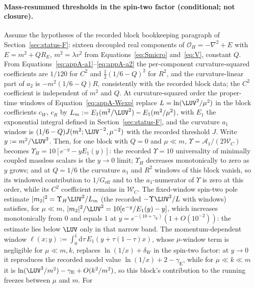 \paragraph{Mass-resummed thresholds in the spin-two factor
(conditional; not closure).}
Assume the hypotheses of the recorded block bookkeeping paragraph of
Section~\ref{sec:status-F}: sixteen decoupled real components of
\(\mathcal O_H=-\nabla^2+E\) with \(E=m^2+Q R_E\),
\(m^2=\lambda v^2\) from Equations~\eqref{eq:Smicro} and~\eqref{eq:V},
constant \(Q\). From Equations~\eqref{eq:appA-a1}--\eqref{eq:appA-a2}
the per-component curvature-squared coefficients are \(1/120\) for
\(C^2\) and \(\tfrac12(1/6-Q)^2\) for \(R^2\), and the
curvature-linear part of \(a_2\) is \(-m^2(1/6-Q)R\), consistently
with the recorded block data; the \(C^2\) coefficient is independent
of \(m^2\) and \(Q\). At curvature-squared order the
proper-time windows of Equation~\eqref{eq:appA-Wexp} replace
\(L=\ln(\LUV^2/\mu^2)\) in the block coefficients \(c_W\), \(c_R\) by
\(L_m:=E_1(m^2/\LUV^2)-E_1(m^2/\mu^2)\), with \(E_1\) the
exponential integral defined in Section~\ref{sec:status-F}, and the
curvature \(a_1\) window is \((1/6-Q)J(m^2;\LUV^{-2},\mu^{-2})\) with
the recorded threshold \(J\). Write \(y:=m^2/\LUV^2\). Then, for one
block with \(Q=0\) and \(\mu\ll m\),
\(\Upsilon=\mathcal A_1/(2\mathcal W_C)\) becomes
\(\Upsilon_H=10[e^{-y}-yE_1(y)]\): the recorded \(\Upsilon=10\)
universality of minimally coupled massless scalars is the \(y\to0\)
limit; \(\Upsilon_H\) decreases monotonically to zero as \(y\) grows;
and at \(Q=1/6\) the curvature \(a_1\) and \(R^2\) windows of this
block vanish, so its windowed contribution to \(1/G_{\mathrm{eff}}\) and to
the \(a_1\)-numerator of \(\Upsilon\) is zero at this order, while its
\(C^2\) coefficient remains in \(\mathcal W_C\). The fixed-window spin-two
pole estimate
\(|m_2|^2=\Upsilon_H\LUV^2/L_m\) (the recorded
\(-\Upsilon\LUV^2/L\) with windows) satisfies, for \(\mu\ll m\),
\(|m_2|^2/\LUV^2=10[e^{-y}/E_1(y)-y]\), which increases
monotonically from \(0\) and equals \(1\) at
\(y=e^{-(10+\gamma_{\mathrm E})}(1+O(10^{-2}))\): the estimate lies
below \(\LUV\) only in that narrow band. The momentum-dependent
window \(\ell(x;y):=\int_0^1\mathrm{d}\tau\,
E_1(y+\tau(1-\tau)x)\), whose \(\mu\)-window term is negligible for
\(\mu\ll m,k\), replaces \(\ln(1/x)+\delta_W\) in the spin-two
factor: at \(y\to0\) it reproduces the recorded model value
\(\ln(1/x)+2-\gamma_{\mathrm E}\), while for \(\mu\ll k\ll m\) it is
\(\ln(\LUV^2/m^2)-\gamma_{\mathrm E}+O(k^2/m^2)\), so this block's
contribution to the running freezes between \(\mu\) and \(m\). For
